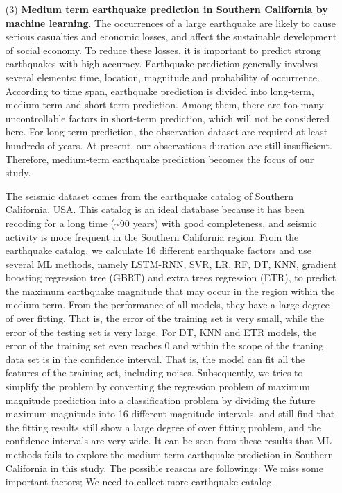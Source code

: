 \begin{enumerate}
  \item[(3)] \textbf{Medium term earthquake prediction in Southern California by machine learning}. The occurrences of a large earthquake are likely to cause serious casualties and economic losses, and affect the sustainable development of social economy. To reduce these losses, it is important to predict strong earthquakes with high accuracy. Earthquake prediction generally involves several elements: time, location, magnitude and probability of occurrence. According to time span, earthquake prediction is divided into long-term, medium-term and short-term prediction. Among them, there are too many uncontrollable factors in short-term prediction, which will not be considered here. For long-term prediction, the observation dataset are required at least hundreds of years. At present, our observations duration are still insufficient. Therefore, medium-term earthquake prediction becomes the focus of our study.

  The seismic dataset comes from the earthquake catalog of Southern California, USA. This catalog is an ideal database because it has been recoding for a long time (\sim 90 years) with good completeness, and seismic activity is more frequent in the Southern California region. From the earthquake catalog, we calculate 16 different earthquake factors and use several ML methods, namely LSTM-RNN, SVR, LR, RF, DT, KNN, gradient boosting regression tree (GBRT) and extra trees regression (ETR), to predict the maximum earthquake magnitude that may occur in the region within the medium term. From the performance of all models, they have a large degree of over fitting. That is, the error of the training set is very small, while the error of the testing set is very large. For DT, KNN and ETR models, the error of the training set even reaches 0 and within the scope of the traning data set is in the confidence interval. That is, the model can fit all the features of the training set, including noises. Subsequently, we tries to simplify the problem by converting the regression problem of maximum magnitude prediction into a classification problem by dividing the future maximum magnitude into 16 different magnitude intervals, and still find that the fitting results still show a large degree of over fitting problem, and the confidence intervals are very wide. It can be seen from these results that ML methods fails to explore the medium-term earthquake prediction in Southern California in this study. The possible reasons are followings: We miss some important factors; We need to collect more earthquake catalog.

\end{enumerate}
